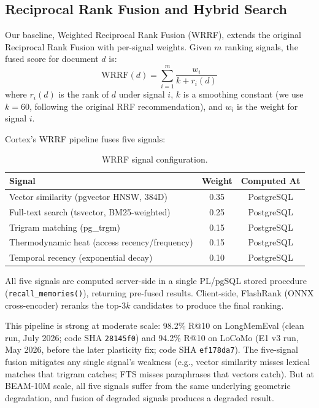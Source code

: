 \documentclass[11pt]{article}
\newcommand{\eg}{e.g.}
\begin{document}
\subsection{Reciprocal Rank Fusion and Hybrid Search}
\label{sec:rrf}

Our baseline, Weighted Reciprocal Rank Fusion (WRRF), extends the
original Reciprocal Rank Fusion \citep{Cormack2009} with per-signal
weights.  Given $m$ ranking signals, the fused score for document $d$
is:
\begin{equation}
\text{WRRF}(d) = \sum_{i=1}^{m} \frac{w_i}{k + r_i(d)}
\label{eq:wrrf}
\end{equation}
where $r_i(d)$ is the rank of $d$ under signal $i$, $k$ is a
smoothing constant (we use $k = 60$, following the original RRF
recommendation), and $w_i$ is the weight for signal $i$.

Cortex's WRRF pipeline fuses five signals:

\begin{table}[h]
\centering
\caption{WRRF signal configuration.}
\label{tab:wrrf-signals}
\begin{tabular}{lcc}
\toprule
Signal & Weight & Computed At \\
\midrule
Vector similarity (pgvector HNSW, 384D) & 0.35 & PostgreSQL \\
Full-text search (tsvector, BM25-weighted) & 0.25 & PostgreSQL \\
Trigram matching (pg\_trgm) & 0.15 & PostgreSQL \\
Thermodynamic heat (access recency/frequency) & 0.15 & PostgreSQL \\
Temporal recency (exponential decay) & 0.10 & PostgreSQL \\
\bottomrule
\end{tabular}
\end{table}

All five signals are computed server-side in a single PL/pgSQL stored
procedure (\texttt{recall\_memories()}), returning pre-fused results.
Client-side, FlashRank (ONNX cross-encoder) reranks the top-$3k$
candidates to produce the final ranking.

This pipeline is strong at moderate scale: 98.2\% R@10 on
LongMemEval (clean run, July 2026; code SHA \texttt{28145f0}) and
94.2\% R@10 on LoCoMo (E1 v3 run, May 2026, before the later plasticity fix; code SHA
\texttt{ef178da7}).  The five-signal fusion
mitigates any single signal's weakness (\eg, vector similarity
misses lexical matches that trigram catches; FTS misses paraphrases
that vectors catch).  But at BEAM-10M scale, all five signals suffer
from the same underlying geometric degradation, and fusion of
degraded signals produces a degraded result.
\end{document}
